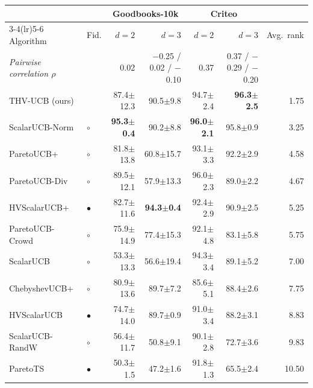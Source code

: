 \begin{tabular}{llrrrrr}
\toprule
 & & \multicolumn{2}{c}{Goodbooks-10k} & \multicolumn{2}{c}{Criteo} & \\
\cmidrule(lr){3-4}\cmidrule(lr){5-6}
Algorithm & Fid. & $d=2$ & $d=3$ & $d=2$ & $d=3$ & Avg.\ rank\\
\midrule
\textit{Pairwise correlation $\rho$} & & {\scriptsize 0.02} & {\scriptsize $-$0.25 / 0.02 / $-$0.10} & {\scriptsize 0.37} & {\scriptsize 0.37 / $-$0.29 / $-$0.20} & \\
\midrule
THV-UCB (ours) &  & 87.4{\scriptsize$\pm$12.3} & 90.5{\scriptsize$\pm$9.8} & 94.7{\scriptsize$\pm$2.4} & \textbf{96.3{\scriptsize$\pm$2.5}} & 1.75\\
\midrule
ScalarUCB-Norm & $\circ$ & \textbf{95.3{\scriptsize$\pm$0.4}} & 90.2{\scriptsize$\pm$8.8} & \textbf{96.0{\scriptsize$\pm$2.1}} & 95.8{\scriptsize$\pm$0.9} & 3.25\\
ParetoUCB+ & $\circ$ & 81.8{\scriptsize$\pm$13.8} & 60.8{\scriptsize$\pm$15.7} & 93.1{\scriptsize$\pm$3.3} & 92.2{\scriptsize$\pm$2.9} & 4.58\\
ParetoUCB-Div & $\circ$ & 89.5{\scriptsize$\pm$12.1} & 57.9{\scriptsize$\pm$13.3} & 96.0{\scriptsize$\pm$2.3} & 89.0{\scriptsize$\pm$2.2} & 4.67\\
HVScalarUCB+ & $\bullet$ & 82.7{\scriptsize$\pm$11.6} & \textbf{94.3{\scriptsize$\pm$0.4}} & 92.4{\scriptsize$\pm$2.9} & 90.9{\scriptsize$\pm$2.5} & 5.25\\
ParetoUCB-Crowd & $\circ$ & 75.9{\scriptsize$\pm$14.9} & 77.4{\scriptsize$\pm$15.3} & 92.1{\scriptsize$\pm$4.8} & 83.1{\scriptsize$\pm$5.8} & 5.75\\
ScalarUCB & $\circ$ & 53.3{\scriptsize$\pm$13.3} & 56.6{\scriptsize$\pm$19.4} & 94.3{\scriptsize$\pm$3.4} & 89.1{\scriptsize$\pm$5.2} & 7.00\\
ChebyshevUCB+ & $\circ$ & 80.9{\scriptsize$\pm$13.6} & 89.7{\scriptsize$\pm$7.2} & 85.6{\scriptsize$\pm$5.1} & 88.4{\scriptsize$\pm$2.6} & 7.75\\
HVScalarUCB & $\bullet$ & 74.7{\scriptsize$\pm$14.0} & 89.7{\scriptsize$\pm$0.9} & 91.0{\scriptsize$\pm$3.4} & 88.2{\scriptsize$\pm$3.1} & 8.83\\
ScalarUCB-RandW & $\circ$ & 56.4{\scriptsize$\pm$11.7} & 50.8{\scriptsize$\pm$9.1} & 90.1{\scriptsize$\pm$2.8} & 72.7{\scriptsize$\pm$3.6} & 9.83\\
ParetoTS & $\bullet$ & 50.3{\scriptsize$\pm$1.5} & 47.2{\scriptsize$\pm$1.6} & 91.8{\scriptsize$\pm$1.3} & 65.5{\scriptsize$\pm$2.4} & 10.50\\

\end{tabular}
